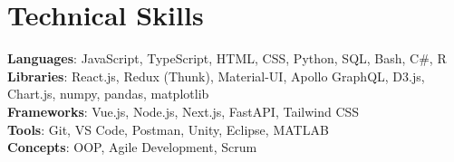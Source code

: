 \section{Technical Skills}
 \begin{itemize}[leftmargin=0.15in, label={}]
  \small{\item{
    \textbf{Languages}{: JavaScript, TypeScript, HTML, CSS, Python, SQL, Bash, C#, R} \\
    \textbf{Libraries}{: React.js, Redux (Thunk), Material-UI, Apollo GraphQL, D3.js, Chart.js, numpy, pandas, matplotlib} \\
    \textbf{Frameworks}{: Vue.js, Node.js, Next.js, FastAPI, Tailwind CSS} \\
    \textbf{Tools}{: Git, VS Code, Postman, Unity, Eclipse, MATLAB} \\
    \textbf{Concepts}{: OOP, Agile Development, Scrum} \\
  }}
 \end{itemize}

